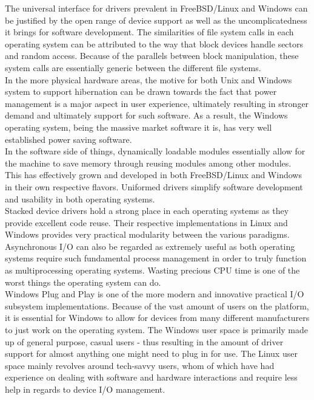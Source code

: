 \documentclass[letterpaper,10pt,titlepage]{article}
\begin{document}
The universal interface for drivers prevalent in FreeBSD/Linux and Windows can be justified by the open range of device support as well as the uncomplicatedness it brings for software development.  The similarities of file system calls in each operating system can be attributed to the way that block devices handle sectors and random access.  Because of the parallels between block manipulation, these system calls are essentially generic between the different file systems.\\

In the more physical hardware areas, the motive for both Unix and Windows system to support hibernation can be drawn towards the fact that power management is a major aspect in user experience, ultimately resulting in stronger demand and ultimately support for such software.  As a result, the Windows operating system, being the massive market software it is, has very well established power saving software.\\

In the software side of things, dynamically loadable modules essentially allow for the machine to save memory through reusing modules among other modules. This has effectively grown and developed in both FreeBSD/Linux and Windows in their own respective flavors.  Uniformed drivers simplify software development and usability in both operating systems.\\

Stacked device drivers hold a strong place in each operating systems as they provide excellent code reuse.  Their respective implementations in Linux and Windows provides very practical modularity between the various paradigms.  Asynchronous I/O can also be regarded as extremely useful as both operating systems require such fundamental process management in order to truly function as multiprocessing operating systems.  Wasting precious CPU time is one of the worst things the operating system can do.\\

Windows Plug and Play is one of the more modern and innovative practical I/O subsystem implementations.  Because of the vast amount of users on the platform, it is essential for Windows to allow for devices from many different manufacturers to just work on the operating system.  The Windows user space is primarily made up of general purpose, casual users - thus resulting in the amount of driver support for almost anything one might need to plug in for use.  The Linux user space mainly revolves around tech-savvy users, whom of which have had experience on dealing with software and hardware interactions and require less help in regards to device I/O management.\\

\newpage


\end{document}
